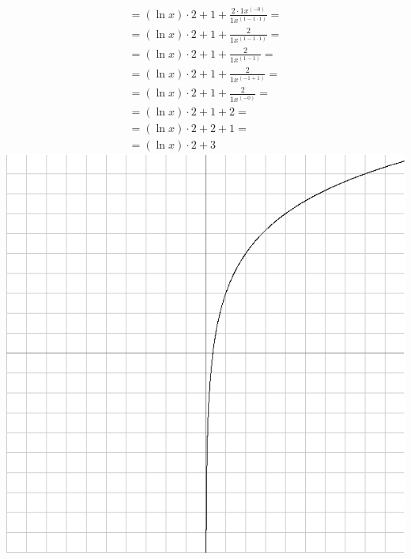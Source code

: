 \documentclass{article}
\begin{document}
\begin{gather*}
={{{\left(\ln{{x}}\right)}{\cdot}{2}}+{{1}+{\frac{{{2}{\cdot}{{1}{{x}^{\left(-{0}\right)}}}}}{{{1}{{x}^{\left({1}-{{1}{\cdot}{1}}\right)}}}}}}}=\\
={{{\left(\ln{{x}}\right)}{\cdot}{2}}+{{1}+{\frac{{2}}{{{1}{{x}^{\left({1}-{{1}{\cdot}{1}}\right)}}}}}}}=\\
={{{\left(\ln{{x}}\right)}{\cdot}{2}}+{{1}+{\frac{{2}}{{{1}{{x}^{\left({1}-{1}\right)}}}}}}}=\\
={{{\left(\ln{{x}}\right)}{\cdot}{2}}+{{1}+{\frac{{2}}{{{1}{{x}^{\left({-{1}}+{1}\right)}}}}}}}=\\
={{{\left(\ln{{x}}\right)}{\cdot}{2}}+{{1}+{\frac{{2}}{{{1}{{x}^{\left(-{0}\right)}}}}}}}=\\
={{{\left(\ln{{x}}\right)}{\cdot}{2}}+{{1}+{2}}}=\\
={{{\left(\ln{{x}}\right)}{\cdot}{2}}+{{2}+{1}}}=\\
={{{\left(\ln{{x}}\right)}{\cdot}{2}}+{3}}\end{gather*}
\centering\includegraphics[scale=0.5]{graph.png}
\end{document}
